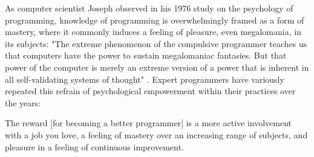 As computer scientist Joseph \citeauthor{Weizenbaum76} observed in his 1976 study on the psychology of programming, knowledge of programming is overwhelmingly framed as a form of mastery, where it commonly induces a feeling of pleasure, even megalomania, in its subjects: "The extreme phenomenon of the compulsive programmer teaches us that computers have the power to sustain megalomaniac fantasies. But that power of the computer is merely an extreme version of a power that is inherent in all self-validating systems of thought" \autocite[130]{Weizenbaum76}. Expert programmers have variously repeated this refrain of psychological empowerment within their practices over the years:

\begin{quoting}The reward [for becoming a better programmer] is a more active involvement with a job you love, a feeling of mastery over an increasing range of subjects, and pleasure in a feeling of continuous improvement. \autocite[12]{Hunt1999}
 \end{quoting}

